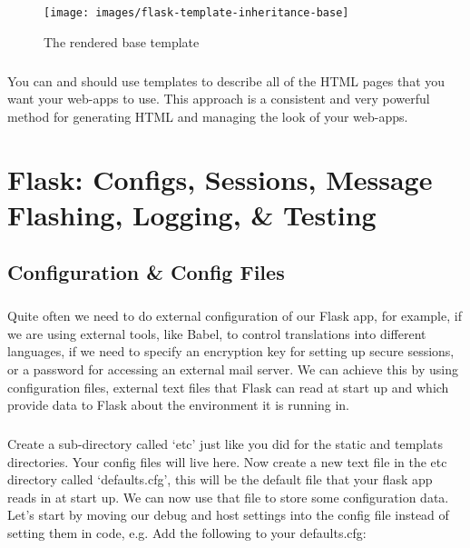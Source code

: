 \documentclass[12pt, a4paper, oneside]{book}
\begin{document}
\begin{figure}[H]
\centering
\texttt{[image: images/flask-template-inheritance-base]}
\caption{The rendered base template}
\label{fig:flask-template-inheritance-base}
\end{figure}

\paragraph{} You can and should use templates to describe all of the HTML pages that you want your web-apps to use. This approach is a consistent and very powerful method for generating HTML and managing the look of your web-apps.


\chapter{Flask: Configs, Sessions, Message Flashing, Logging, \& Testing}
\label{lab06}
\paragraph{} 

\section{Configuration \& Config Files}
\label{configs}
\paragraph{} Quite often we need to do external configuration of our Flask app, for example, if we are using external tools, like Babel, to control translations into different languages, if we need to specify an encryption key for setting up secure sessions, or a password for accessing an external mail server. We can achieve this by using configuration files, external text files that Flask can read at start up and which provide data to Flask about the environment it is running in.

\paragraph{} Create a sub-directory called `etc' just like you did for the static and templats directories. Your config files will live here. Now create a new text file in the etc directory called `defaults.cfg', this will be the default file that your flask app reads in at start up. We can now use that file to store some configuration data. Let's start by moving our debug and host settings into the config file instead of setting them in code, e.g. Add the following to your defaults.cfg:
\end{document}
